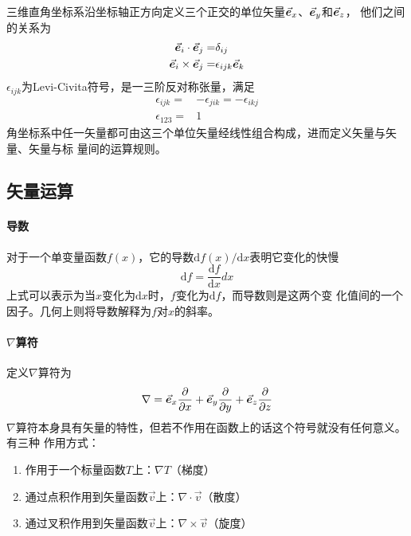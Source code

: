 
三维直角坐标系沿坐标轴正方向定义三个正交的单位矢量$\vec{\bm{e}}_x$、$\vec{\bm{e}}_y$和$\vec{\bm{e}}_z$，
他们之间的关系为
\begin{equation}
    \begin{aligned}
        \vec{\bm{e}}_{i} \cdot  \vec{\bm{e}}_{j} =& \delta_{ij} \\
        \vec{\bm{e}}_{i} \times \vec{\bm{e}}_{j} =& \epsilon_{ijk} \vec{\bm{e}}_{k}
    \end{aligned}
    \label{eq:vec-cartesian}
\end{equation}
$\epsilon_{ijk}$为Levi-Civita符号，是一三阶反对称张量，满足
\begin{equation}
    \begin{aligned}
        \epsilon_{ijk} =& - \epsilon_{jik} = -\epsilon_{ikj} \\
        \epsilon_{123} =& 1
    \end{aligned}
    \label{eq:Levi-Civita}
\end{equation}
角坐标系中任一矢量都可由这三个单位矢量经线性组合构成，进而定义矢量与矢量、矢量与标
量间的运算规则。

\subsection{矢量运算}
\paragraph*{导数}
对于一个单变量函数$f(x)$，它的导数$\mathrm{d} f(x)/ \mathrm{d} x$表明它变化的快慢
\begin{equation}
    \mathrm{d} f = \frac{\mathrm{d} f}{\mathrm{d} x} dx
                                \label{eq:vec-derivative}
\end{equation}
上式可以表示为当$x$变化为$\mathrm{d}x$时，$f$变化为$\mathrm{d}f$，而导数则是这两个变
化值间的一个因子。几何上则将导数解释为$f$对$x$的斜率。

\paragraph*{$\nabla$算符}
定义$\nabla$算符为
\begin{equation}
    \nabla =    \vec{\bm{e}}_x \frac{\partial}{\partial x} 
               +\vec{\bm{e}}_y \frac{\partial}{\partial y}
               +\vec{\bm{e}}_z \frac{\partial}{\partial z}
    \label{eq:def-nabla-cartesian}
\end{equation}
$\nabla$算符本身具有矢量的特性，但若不作用在函数上的话这个符号就没有任何意义。有三种
作用方式：
\begin{enumerate}
    \item 作用于一个标量函数$T$上：$\nabla T$（梯度）
    \item 通过点积作用到矢量函数$\vec{v}$上：$\nabla \cdot \vec{v}$（散度）
    \item 通过叉积作用到矢量函数$\vec{v}$上：$\nabla \times \vec{v}$（旋度）
\end{enumerate}

